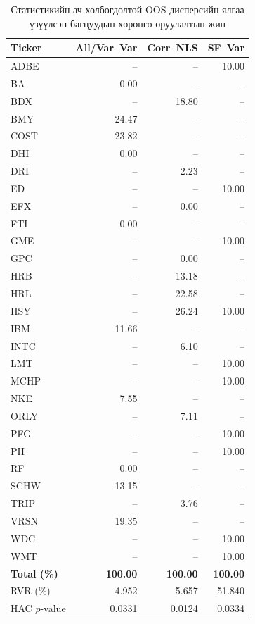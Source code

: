 \begin{table}[htbp]
	\centering
	\caption{Статистикийн ач холбогдолтой OOS дисперсийн
		ялгаа үзүүлсэн багцуудын хөрөнгө оруулалтын жин}
	\label{tab:significant_portfolio_weights}
	\small
	\setlength{\tabcolsep}{9pt}
	\renewcommand{\arraystretch}{1.1}
	
	\begin{tabular}{lrrr}
		\toprule
		Ticker & All/Var--Var & Corr--NLS & SF--Var \\
		\midrule
		ADBE & -- & -- & 10.00 \\
		BA   & 0.00 & -- & -- \\
		BDX  & -- & 18.80 & -- \\
		BMY  & 24.47 & -- & -- \\
		COST & 23.82 & -- & -- \\
		DHI  & 0.00 & -- & -- \\
		DRI  & -- & 2.23 & -- \\
		ED   & -- & -- & 10.00 \\
		EFX  & -- & 0.00 & -- \\
		FTI  & 0.00 & -- & -- \\
		GME  & -- & -- & 10.00 \\
		GPC  & -- & 0.00 & -- \\
		HRB  & -- & 13.18 & -- \\
		HRL  & -- & 22.58 & -- \\
		HSY  & -- & 26.24 & 10.00 \\
		IBM  & 11.66 & -- & -- \\
		INTC & -- & 6.10 & -- \\
		LMT  & -- & -- & 10.00 \\
		MCHP & -- & -- & 10.00 \\
		NKE  & 7.55 & -- & -- \\
		ORLY & -- & 7.11 & -- \\
		PFG  & -- & -- & 10.00 \\
		PH   & -- & -- & 10.00 \\
		RF   & 0.00 & -- & -- \\
		SCHW & 13.15 & -- & -- \\
		TRIP & -- & 3.76 & -- \\
		VRSN & 19.35 & -- & -- \\
		WDC  & -- & -- & 10.00 \\
		WMT  & -- & -- & 10.00 \\
		\midrule
		\textbf{Total (\%)} & \textbf{100.00} & \textbf{100.00}
		& \textbf{100.00} \\
		\midrule
		RVR (\%) & 4.952 & 5.657 & -51.840 \\
		HAC $p$-value & 0.0331 & 0.0124 & 0.0334 \\
		\bottomrule
	\end{tabular}
	

\end{table}
